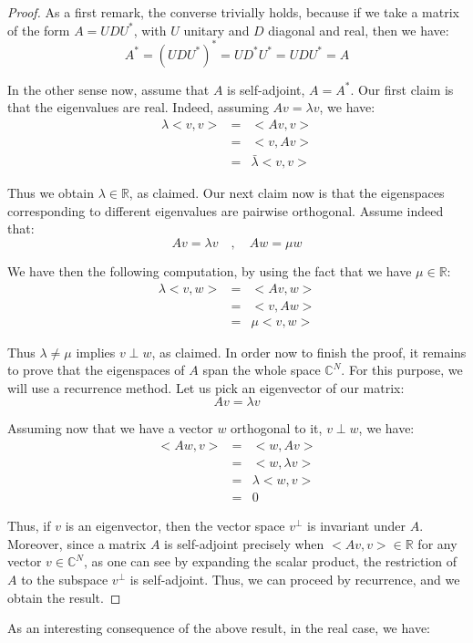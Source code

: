 \documentclass[12pt]{amsbook}
\begin{document}
\begin{proof}
As a first remark, the converse trivially holds, because if we take a matrix of the form $A=UDU^*$, with $U$ unitary and $D$ diagonal and real, then we have:
$$A^*
=(UDU^*)^*
=UD^*U^*
=UDU^*
=A$$

In the other sense now, assume that $A$ is self-adjoint, $A=A^*$.  Our first claim is that the eigenvalues are real. Indeed, assuming $Av=\lambda v$, we have:
\begin{eqnarray*}
\lambda<v,v>
&=&<Av,v>\\
&=&<v,Av>\\
&=&\bar{\lambda}<v,v>
\end{eqnarray*}

Thus we obtain $\lambda\in\mathbb R$, as claimed. Our next claim now is that the eigenspaces corresponding to different eigenvalues are pairwise orthogonal. Assume indeed that:
$$Av=\lambda v\quad,\quad 
Aw=\mu w$$

We have then the following computation, by using the fact that we have $\mu\in\mathbb R$:
\begin{eqnarray*}
\lambda<v,w>
&=&<Av,w>\\
&=&<v,Aw>\\
&=&\mu<v,w>
\end{eqnarray*}

Thus $\lambda\neq\mu$ implies $v\perp w$, as claimed. In order now to finish the proof, it remains to prove that the eigenspaces of $A$ span the whole space $\mathbb C^N$. For this purpose, we will use a recurrence method. Let us pick an eigenvector of our matrix:
$$Av=\lambda v$$

Assuming now that we have a vector $w$ orthogonal to it, $v\perp w$, we have:
\begin{eqnarray*}
<Aw,v>
&=&<w,Av>\\
&=&<w,\lambda v>\\
&=&\lambda<w,v>\\
&=&0
\end{eqnarray*}

Thus, if $v$ is an eigenvector, then the vector space $v^\perp$ is invariant under $A$. Moreover, since a matrix $A$ is self-adjoint precisely when $<Av,v>\in\mathbb R$ for any vector $v\in\mathbb C^N$, as one can see by expanding the scalar product, the restriction of $A$ to the subspace $v^\perp$ is self-adjoint. Thus, we can proceed by recurrence, and we obtain the result.
\end{proof}

As an interesting consequence of the above result, in the real case, we have:
\end{document}
